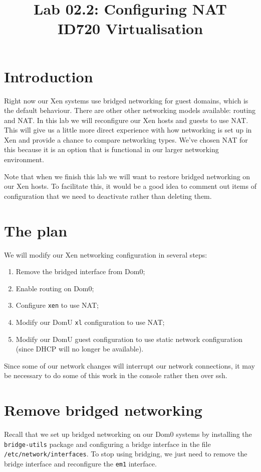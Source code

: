 \documentclass{article}
\begin{document}
\title{Lab 02.2: Configuring NAT\\ ID720 Virtualisation}
\date{}
\maketitle

\section*{Introduction}
Right now our Xen systems use bridged networking for guest domains, which is the default behaviour. There are 
other other networking models available: routing and NAT. In this lab we will reconfigure our Xen hosts and guests 
to use NAT. This will give us a little more direct experience with how networking is set up in Xen and provide a chance 
to compare networking types. We've chosen NAT for this because it is an option that is functional in our larger 
networking environment.

Note that when we finish this lab we will want to restore bridged networking on our Xen hosts. To facilitate this, it 
would be a good idea to comment out items of configuration that we need to deactivate rather than deleting them.

\section{The plan}
We will modify our Xen networking configuration in several steps:

\begin{enumerate}
  \item Remove the bridged interface from Dom0;
  \item Enable routing on Dom0;
  \item Configure \texttt{xen} to use NAT;
  \item Modify our DomU \texttt{xl} configuration to use NAT;
  \item Modify our DomU guest configuration to use static network configuration (since DHCP will no longer be available).
\end{enumerate}

Since some of our network changes will interrupt our network connections, it may be necessary to do some of this work in the console rather then over ssh.

\section{Remove bridged networking}
Recall that we set up bridged networking on our Dom0 systems by installing the \texttt{bridge-utils} package and configuring a bridge interface in the file \texttt{/etc/network/interfaces}. To stop using bridging, we just need to remove 
the bridge interface and reconfigure the \texttt{em1} interface.
\end{document}
